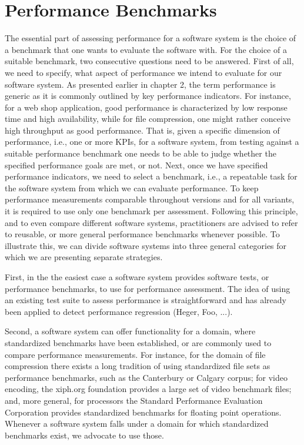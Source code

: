 \section{Performance Benchmarks}
The essential part of assessing performance for a software system is the choice
of a benchmark that one wants to evaluate the software with. For the choice of
a suitable benchmark, two consecutive questions need to be answered. First of
all, we need to specify, what aspect of performance we intend to evaluate for
our software system. As presented earlier in chapter 2, the term performance is
generic as it is commonly outlined by key performance indicators. For instance,
for a web shop application, good performance is characterized by low response
time and high availability, while for file compression, one might rather
conceive high throughput as good performance. That is, given a specific
dimension of performance, i.e., one or more KPIs, for a software system, from
testing against a suitable performance benchmark one needs to be able to judge
whether the specified performance goals are met, or not.
Next, once we have specified performance indicators, we need to select a
benchmark, i.e., a repeatable task for the software system from which we can
evaluate performance. To keep performance measurements comparable throughout
versions and for all variants, it is required to use only one benchmark per
assessment. Following this principle, and to even compare different software
systems, practitioners are advised to refer to reusable, or more general
performance benchmarks whenever possible. To illustrate this, we can divide
software systems into three general categories for which we are presenting
separate strategies.

First, in the the easiest case a software system provides software tests, or
performance benchmarks, to use for performance assessment. The idea of using an
existing test suite to assess performance is straightforward and has already
been applied to detect performance regression (Heger, Foo, ...).

Second, a software system can offer functionality for a domain, where
standardized benchmarks have been established, or are commonly used to compare
performance measurements. For instance, for the domain of file compression
there exists a long tradition of using standardized file sets as performance
benchmarks, such as the Canterbury or Calgary corpus; for video encoding, the
xiph.org foundation provides a large set of video benchmark files; and, more
general, for processors the Standard Performance Evaluation Corporation
provides standardized benchmarks for floating point operations. Whenever a
software system falls under a domain for which standardized benchmarks exist,
we advocate to use those.

